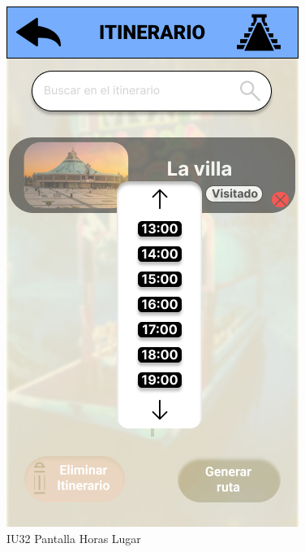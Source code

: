 \begin{figure}[h]
    \begin{minipage}{0.5\textwidth}
        \centering
        \includegraphics[width=.7\linewidth]{Pantallas Prototipo3/IU32 Pantalla Horas Lugar.jpg}
        \caption{IU32 Pantalla Horas Lugar}
    \end{minipage}%
\end{figure}

